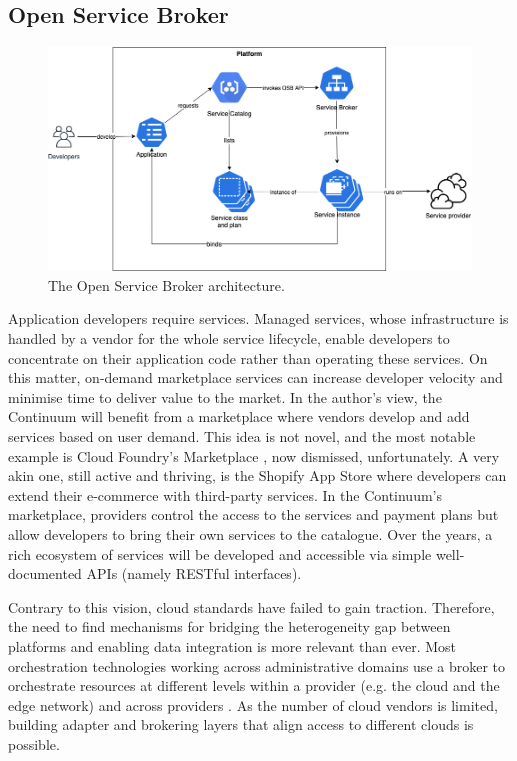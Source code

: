 \subsection{Open Service Broker}
\label{sec:osb}

\begin{figure}[ht]
\centering
\includegraphics[width=\columnwidth]{figures/osb}
\caption{The Open Service Broker architecture.} \label{fig:osb}
\end{figure}

Application developers require services. Managed services, whose infrastructure is handled by a vendor for the whole service lifecycle, enable developers to concentrate on their application code rather than operating these services. On this matter, on-demand marketplace services can increase developer velocity and minimise time to deliver value to the market. In the author's view, the Continuum will benefit from a marketplace where vendors develop and add services based on user demand. This idea is not novel, and the most notable example is Cloud Foundry's Marketplace \cite{cloud-foundry-marketplace}, now dismissed, unfortunately. A very akin one, still active and thriving, is the Shopify App Store \cite{shopify} where developers can extend their e-commerce with third-party services. In the Continuum's marketplace, providers control the access to the services and payment plans but allow developers to bring their own services to the catalogue. Over the years, a rich ecosystem of services will be developed and accessible via simple well-documented APIs (namely RESTful interfaces).

Contrary to this vision, cloud standards have failed to gain traction. Therefore, the need to find mechanisms for bridging the heterogeneity gap between platforms and enabling data integration is more relevant than ever. Most orchestration technologies working across administrative domains use a broker to orchestrate resources at different levels within a provider (e.g. the cloud and the edge network) and across providers \cite{grozev2014inter}. As the number of cloud vendors is limited, building adapter and brokering layers that align access to different clouds is possible. 


